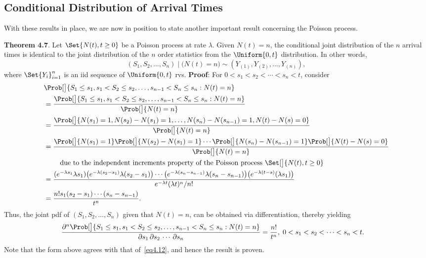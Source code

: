 \subsection*{Conditional Distribution of Arrival Times}
With these results in place, we are now in position to state another important result
concerning the Poisson process.
\begin{Result}
    \textbf{Theorem 4.7}. Let $ \Set{N(t),t\ge 0} $ be a Poisson process at rate $ \lambda $. Given $ N(t)=n $,
    the conditional joint distribution of the $ n $ arrival times is identical to the joint distribution of the $ n $ order statistics
    from the $ \Uniform{0,t} $ distribution. In other words,
    \[ (S_1,S_2,\ldots,S_n)\mid \bigl(N(t)=n\bigr)\sim (Y_{(1)},Y_{(2)},\ldots,Y_{(n)}), \]
    where $ \Set{Y_i}_{i=1}^n $ is an iid sequence of $ \Uniform{0,t} $ rvs.
    \tcblower{}
    \textbf{Proof}: For $ 0<s_1<s_2<\cdots<s_n<t $, consider
    \begin{align*}
         & \Prob[\big]{S_1\le s_1,s_1<S_2\le s_2,\ldots,s_{n-1}< S_n\le s_n\given N(t)=n}                                           \\
         & =\frac{\Prob[\big]{S_1\le s_1,s_1<S_2\le s_2,\ldots,s_{n-1}< S_n\le s_n\given N(t)=n}}{\Prob[\big]{N(t)=n}}              \\
         & =\frac{\Prob[\big]{N(s_1)=1,N(s_2)-N(s_1)=1,\ldots,N(s_n)-N(s_{n-1})=1,N(t)-N(s)=0}}{\Prob[\big]{N(t)=n}}                \\
         & =\frac{\Prob[\big]{N(s_1)=1}
            \Prob[\big]{N(s_2)-N(s_1)=1}\cdots
            \Prob[\big]{N(s_n)-N(s_{n-1})=1}
        \Prob[\big]{N(t)-N(s)=0}}{\Prob[\big]{N(t)=n}}                                                                              \\
         & \phantom{{}={}}\quad\text{due to the independent increments property of the Poisson process $ \Set[\big]{N(t),t\ge 0} $} \\
         & =\frac{(e^{-\lambda s_1}\lambda s_1)
            \bigl(e^{-\lambda (s_2-s_{1})}\lambda (s_2-s_{1})\bigr)\cdots
            \bigl(e^{-\lambda (s_n-s_{n-1})}\lambda (s_n-s_{n-1})\bigr)
        \bigl(e^{-\lambda (t-s)}(\lambda s_1)\bigr)}{e^{-\lambda t}(\lambda t)^n/n!}                                                \\
         & =\frac{n!s_1(s_2-s_1)\cdots(s_{n}-s_{n-1})}{t^n}.
    \end{align*}
    Thus, the joint pdf of $ (S_1,S_2,\ldots,S_n) $ given that $ N(t)=n $, can
    be obtained via differentiation, thereby yielding
    \begin{align*}
        \frac{\partial^n
        \Prob[\big]{S_1\le s_1,s_1<S_2\le s_2,\ldots,s_{n-1}< S_n\le s_n\given N(t)=n}}{\partial s_1\,\partial s_2\,\cdots\,\partial s_n}
         & =\frac{n!}{t^n},\; 0<s_1<s_2<\cdots<s_n<t.
    \end{align*}
    Note that the form above agrees with that of~\ref{eq4.12}, and hence
    the result is proven.
\end{Result}
